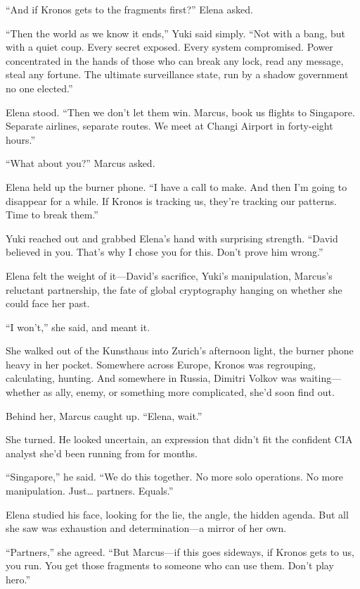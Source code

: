 ``And if Kronos gets to the fragments first?'' Elena asked.

``Then the world as we know it ends,'' Yuki said simply. ``Not with a bang, but with a quiet coup. Every secret exposed. Every system compromised. Power concentrated in the hands of those who can break any lock, read any message, steal any fortune. The ultimate surveillance state, run by a shadow government no one elected.''

Elena stood. ``Then we don't let them win. Marcus, book us flights to Singapore. Separate airlines, separate routes. We meet at Changi Airport in forty-eight hours.''

``What about you?'' Marcus asked.

Elena held up the burner phone. ``I have a call to make. And then I'm going to disappear for a while. If Kronos is tracking us, they're tracking our patterns. Time to break them.''

Yuki reached out and grabbed Elena's hand with surprising strength. ``David believed in you. That's why I chose you for this. Don't prove him wrong.''

Elena felt the weight of it---David's sacrifice, Yuki's manipulation, Marcus's reluctant partnership, the fate of global cryptography hanging on whether she could face her past.

``I won't,'' she said, and meant it.

She walked out of the Kunsthaus into Zurich's afternoon light, the burner phone heavy in her pocket. Somewhere across Europe, Kronos was regrouping, calculating, hunting. And somewhere in Russia, Dimitri Volkov was waiting---whether as ally, enemy, or something more complicated, she'd soon find out.

Behind her, Marcus caught up. ``Elena, wait.''

She turned. He looked uncertain, an expression that didn't fit the confident CIA analyst she'd been running from for months.

``Singapore,'' he said. ``We do this together. No more solo operations. No more manipulation. Just\ldots{} partners. Equals.''

Elena studied his face, looking for the lie, the angle, the hidden agenda. But all she saw was exhaustion and determination---a mirror of her own.

``Partners,'' she agreed. ``But Marcus---if this goes sideways, if Kronos gets to us, you run. You get those fragments to someone who can use them. Don't play hero.''

